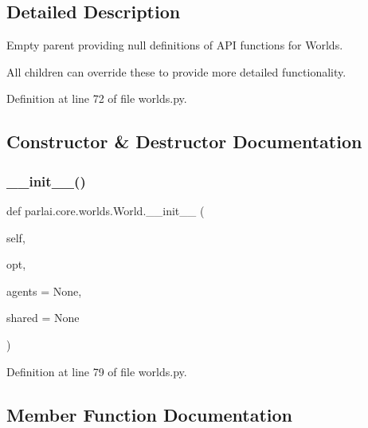 \subsection{Detailed Description}
\begin{DoxyVerb}Empty parent providing null definitions of API functions for Worlds.

All children can override these to provide more detailed functionality.
\end{DoxyVerb}
 

Definition at line 72 of file worlds.\+py.



\subsection{Constructor \& Destructor Documentation}
\mbox{\label{classparlai_1_1core_1_1worlds_1_1World_a8824b02453596976aab9389d2cae2a2f}} 
\subsubsection{\texorpdfstring{\+\_\+\+\_\+init\+\_\+\+\_\+()}{\_\_init\_\_()}}
{\footnotesize\ttfamily def parlai.\+core.\+worlds.\+World.\+\_\+\+\_\+init\+\_\+\+\_\+ (\begin{DoxyParamCaption}\item[{}]{self,  }\item[{}]{opt,  }\item[{}]{agents = {\ttfamily None},  }\item[{}]{shared = {\ttfamily None} }\end{DoxyParamCaption})}



Definition at line 79 of file worlds.\+py.



\subsection{Member Function Documentation}
\mbox{\label{classparlai_1_1core_1_1worlds_1_1World_a714433529a05cc3862ad3b8ade4628f7}} 
